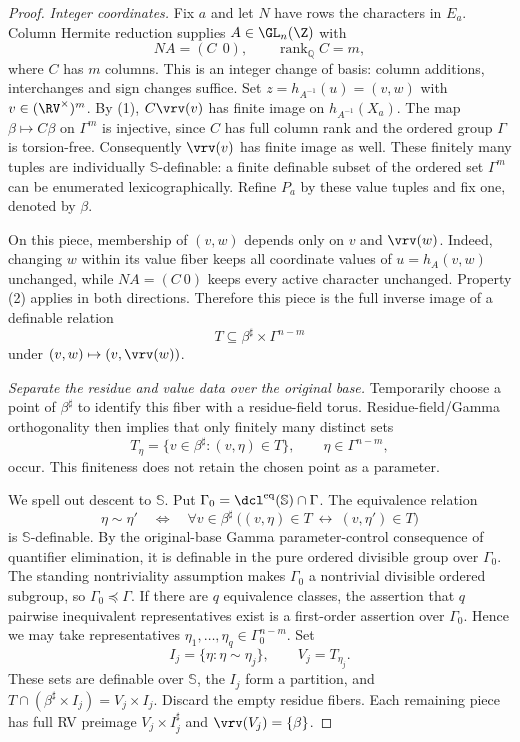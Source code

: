 \begin{proof}
\emph{Integer coordinates.}
Fix $a$ and let $N$ have rows the characters in $E_a$.
Column Hermite reduction supplies $A\in\GL_n(\Z)$ with
\[
 NA=(C\ \ 0),\qquad \operatorname{rank}_{\mathbb Q}C=m,
\]
where $C$ has $m$ columns. This is an integer change of basis:
column additions, interchanges and sign changes suffice.
Set $z=h_{A^{-1}}(u)=(v,w)$ with $v\in(\RV^\times)^m$.
By (1), $C\vrv(v)$ has finite image on $h_{A^{-1}}(X_a)$.
The map $\beta\mapsto C\beta$ on $\Gamma^m$ is injective, since
$C$ has full column rank and the ordered group $\Gamma$ is
torsion-free. Consequently $\vrv(v)$ has finite image as well.
These finitely many tuples are individually $\mathbb S$-definable:
a finite definable subset of the ordered set $\Gamma^m$ can be
enumerated lexicographically. Refine $P_a$ by these value tuples
and fix one, denoted by $\beta$.

On this piece, membership of $(v,w)$ depends only on $v$ and
$\vrv(w)$. Indeed, changing $w$ within its value fiber keeps all
coordinate values of $u=h_A(v,w)$ unchanged, while $NA=(C\ 0)$
keeps every active character unchanged. Property (2) applies in
both directions. Therefore this piece is the full inverse image
of a definable relation
\[
 T\subseteq\beta^\sharp\times\Gamma^{n-m}
\]
under $(v,w)\mapsto(v,\vrv(w))$.

\emph{Separate the residue and value data over the original base.}
Temporarily choose a point of $\beta^\sharp$ to identify this
fiber with a residue-field torus. Residue-field/Gamma
orthogonality then implies that only finitely many distinct sets
\[
 T_\eta=\{v\in\beta^\sharp:(v,\eta)\in T\},
 \qquad \eta\in\Gamma^{n-m},
\]
occur. This finiteness does not retain the chosen point as a
parameter.

We spell out descent to $\mathbb S$. Put
$\Gamma_0=\dcl^{\mathrm{eq}}(\mathbb S)\cap\Gamma$.
The equivalence relation
\[
 \eta\sim\eta' \quad\Longleftrightarrow\quad
 \forall v\in\beta^\sharp\
 \big((v,\eta)\in T\ \longleftrightarrow\ (v,\eta')\in T\big)
\]
is $\mathbb S$-definable. By the original-base Gamma
parameter-control consequence of quantifier elimination, it is
definable in the pure ordered divisible group over $\Gamma_0$.
The standing nontriviality assumption makes $\Gamma_0$ a
nontrivial divisible ordered subgroup, so
$\Gamma_0\preceq\Gamma$. If there are $q$ equivalence classes,
the assertion that $q$ pairwise inequivalent representatives
exist is a first-order assertion over $\Gamma_0$. Hence we may
take representatives $\eta_1,\ldots,\eta_q\in\Gamma_0^{n-m}$.
Set
\[
 I_j=\{\eta:\eta\sim\eta_j\},\qquad V_j=T_{\eta_j}.
\]
These sets are definable over $\mathbb S$, the $I_j$ form a
partition, and
$T\cap(\beta^\sharp\times I_j)=V_j\times I_j$.
Discard the empty residue fibers. Each remaining piece has
full RV preimage $V_j\times I_j^\sharp$ and
$\vrv(V_j)=\{\beta\}$.


\end{proof}
